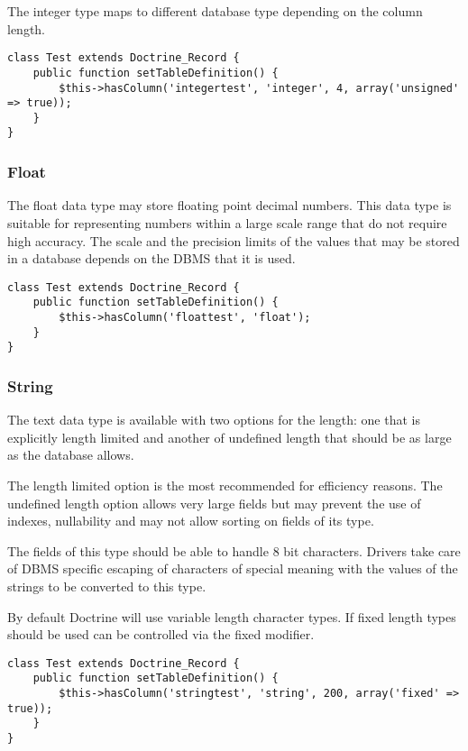 \documentclass[11pt,a4paper]{report}
\begin{document}
The integer type maps to different database type depending on the column length.

\begin{verbatim}
class Test extends Doctrine_Record {
    public function setTableDefinition() {
        $this->hasColumn('integertest', 'integer', 4, array('unsigned' => true));
    }
}
\end{verbatim}

\subsubsection{Float}
The float data type may store floating point decimal numbers. This data type is suitable for representing numbers within a large scale range that do not require high accuracy. The scale and the precision limits of the values that may be stored in a database depends on the DBMS that it is used.

\begin{verbatim}
class Test extends Doctrine_Record {
    public function setTableDefinition() {
        $this->hasColumn('floattest', 'float');
    }
}
\end{verbatim}

\subsubsection{String}
The text data type is available with two options for the length: one that is explicitly length limited and another of undefined length that should be as large as the database allows.

The length limited option is the most recommended for efficiency reasons. The undefined length option allows very large fields but may prevent the use of indexes, nullability and may not allow sorting on fields of its type.

The fields of this type should be able to handle 8 bit characters. Drivers take care of DBMS specific escaping of characters of special meaning with the values of the strings to be converted to this type.

By default Doctrine will use variable length character types. If fixed length types should be used can be controlled via the fixed modifier.

\begin{verbatim}
class Test extends Doctrine_Record {
    public function setTableDefinition() {
        $this->hasColumn('stringtest', 'string', 200, array('fixed' => true));
    }
}
\end{verbatim}
\end{document}
